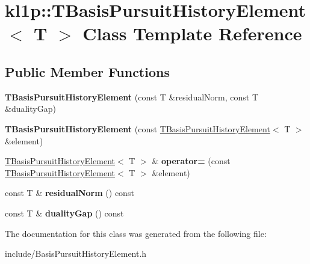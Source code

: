 \hypertarget{classkl1p_1_1TBasisPursuitHistoryElement}{}\section{kl1p\+:\+:T\+Basis\+Pursuit\+History\+Element$<$ T $>$ Class Template Reference}
\label{classkl1p_1_1TBasisPursuitHistoryElement}
\subsection*{Public Member Functions}
\begin{DoxyCompactItemize}
\item 
{\bfseries T\+Basis\+Pursuit\+History\+Element} (const T \&residual\+Norm, const T \&duality\+Gap)\hypertarget{classkl1p_1_1TBasisPursuitHistoryElement_afa1fa8219795d180da3d9b7ac7eddecd}{}\label{classkl1p_1_1TBasisPursuitHistoryElement_afa1fa8219795d180da3d9b7ac7eddecd}

\item 
{\bfseries T\+Basis\+Pursuit\+History\+Element} (const \hyperlink{classkl1p_1_1TBasisPursuitHistoryElement}{T\+Basis\+Pursuit\+History\+Element}$<$ T $>$ \&element)\hypertarget{classkl1p_1_1TBasisPursuitHistoryElement_a358e6a35301bb001bd04f94bc4700935}{}\label{classkl1p_1_1TBasisPursuitHistoryElement_a358e6a35301bb001bd04f94bc4700935}

\item 
\hyperlink{classkl1p_1_1TBasisPursuitHistoryElement}{T\+Basis\+Pursuit\+History\+Element}$<$ T $>$ \& {\bfseries operator=} (const \hyperlink{classkl1p_1_1TBasisPursuitHistoryElement}{T\+Basis\+Pursuit\+History\+Element}$<$ T $>$ \&element)\hypertarget{classkl1p_1_1TBasisPursuitHistoryElement_af976517e351cc0a367f9511bd39b7e92}{}\label{classkl1p_1_1TBasisPursuitHistoryElement_af976517e351cc0a367f9511bd39b7e92}

\item 
const T \& {\bfseries residual\+Norm} () const \hypertarget{classkl1p_1_1TBasisPursuitHistoryElement_a64ba00c3c01b40d86e0659d157db32b4}{}\label{classkl1p_1_1TBasisPursuitHistoryElement_a64ba00c3c01b40d86e0659d157db32b4}

\item 
const T \& {\bfseries duality\+Gap} () const \hypertarget{classkl1p_1_1TBasisPursuitHistoryElement_a17f9926a84b231424a29e7742dc2287e}{}\label{classkl1p_1_1TBasisPursuitHistoryElement_a17f9926a84b231424a29e7742dc2287e}

\end{DoxyCompactItemize}


The documentation for this class was generated from the following file\+:\begin{DoxyCompactItemize}
\item 
include/Basis\+Pursuit\+History\+Element.\+h\end{DoxyCompactItemize}
